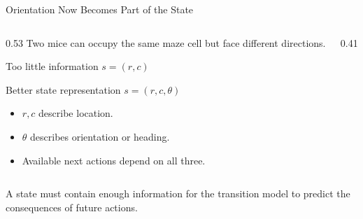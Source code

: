 \documentclass[aspectratio=169,10pt]{beamer}
\begin{document}
\begin{frame}[shrink=20]{Orientation Now Becomes Part of the State}
  \begin{columns}[T,onlytextwidth]
    \begin{column}{0.53\textwidth}
      Two mice can occupy the same maze cell but face different directions.

      \begin{block}{Too little information}
        \centering
        $s=(r,c)$
      \end{block}

      \begin{block}{Better state representation}
        \centering
        $s=(r,c,\theta)$
      \end{block}

      \begin{itemize}
        \item $r,c$ describe location.
        \item $\theta$ describes orientation or heading.
        \item Available next actions depend on all three.
      \end{itemize}
    \end{column}

    \begin{column}{0.41\textwidth}
    \end{column}
  \end{columns}

  \begin{keyidea}
    A state must contain enough information for the transition model to predict the consequences of future actions.
  \end{keyidea}
\end{frame}

\end{document}
